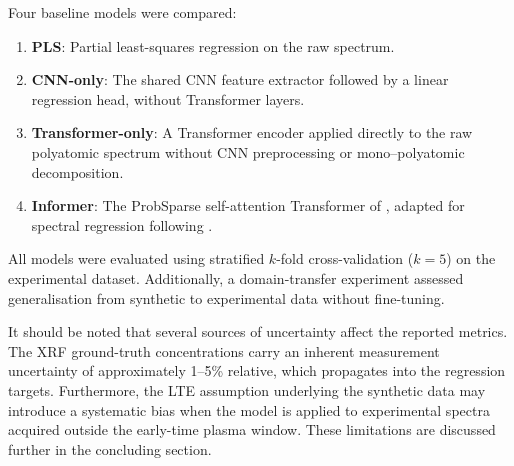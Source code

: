\documentclass{iopjournal}
\begin{document}
Four baseline models were compared:
\begin{enumerate}
\item \textbf{PLS}: Partial least-squares regression \cite{wold_pls_2001} on the raw spectrum.
\item \textbf{CNN-only}: The shared CNN feature extractor followed by a linear regression head, without Transformer layers.
\item \textbf{Transformer-only}: A Transformer encoder applied directly to the raw polyatomic spectrum without CNN preprocessing or mono--polyatomic decomposition.
\item \textbf{Informer}: The ProbSparse self-attention Transformer of \cite{zhou_informer_2021}, adapted for spectral regression following \cite{walidain_informer-based_2026}.
\end{enumerate}

All models were evaluated using stratified $k$-fold cross-validation ($k = 5$) on the experimental dataset.
Additionally, a domain-transfer experiment assessed generalisation from synthetic to experimental data without fine-tuning.

It should be noted that several sources of uncertainty affect the reported metrics.
The XRF ground-truth concentrations carry an inherent measurement uncertainty of approximately 1--5\% relative, which propagates into the regression targets.
Furthermore, the LTE assumption underlying the synthetic data may introduce a systematic bias when the model is applied to experimental spectra acquired outside the early-time plasma window.
These limitations are discussed further in the concluding section.




\end{document}
